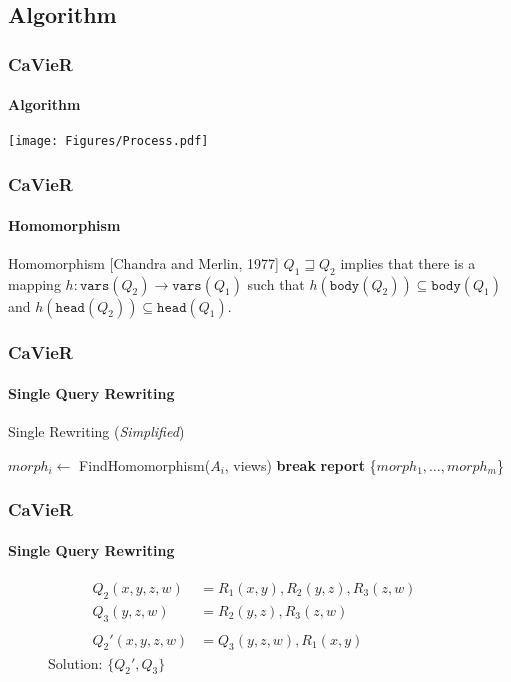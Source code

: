 \documentclass[
	11pt, %
]{beamer}
\begin{document}
\subsection{Algorithm}
\begin{frame}
	\frametitle{CaVieR }
	\framesubtitle{Algorithm}
	\centering
	\texttt{[image: Figures/Process.pdf]}
\end{frame}

\begin{frame}
	\frametitle{CaVieR}
	\framesubtitle{Homomorphism}
	\begin{block}{Homomorphism [Chandra and Merlin, 1977]}
		$Q_1 \sqsupseteq Q_2$ implies that there is a mapping $h: \texttt{vars}(Q_2) \rightarrow \texttt{vars}(Q_1)$ such that $h(\texttt{body}(Q_2)) \subseteq \texttt{body}(Q_1)$ and $h(\texttt{head}(Q_2)) \subseteq \texttt{head}(Q_1)$. 
	\end{block}
\end{frame}

\begin{frame}
	\frametitle{CaVieR}
	\framesubtitle{Single Query Rewriting}
	\begin{algorithm}[H]
		\caption{Single Rewriting (\textit{Simplified})}\label{alg:SingleRewriting}
		\begin{algorithmic}[1]
			\State $morph_i \gets$ FindHomomorphism($A_i$, views)\footnotemark
			\State \textbf{break}
			\EndIf
			\EndFor
			\State \textbf{report} \{$morph_1,\dots,morph_m$\}
			\EndIf
			\EndFor
			\EndFunction
		\end{algorithmic}
	\end{algorithm}
\end{frame}

\begin{frame}
	\frametitle{CaVieR}
	\framesubtitle{Single Query Rewriting}
	\begin{figure}
		\begin{align*}
			Q_2(x,y,z,w) &= R_1(x,y), R_2(y,z), R_3(z,w) &\\
			Q_3(y,z,w) &= R_2(y,z), R_3(z,w)&\\\\
			Q_2'(x,y,z,w)& = Q_3(y,z,w), R_1(x,y)&
		\end{align*}
		\vspace{1cm}
		Solution: $\{Q_2', Q_3\}$
	\end{figure}
\end{frame}
\end{document}

